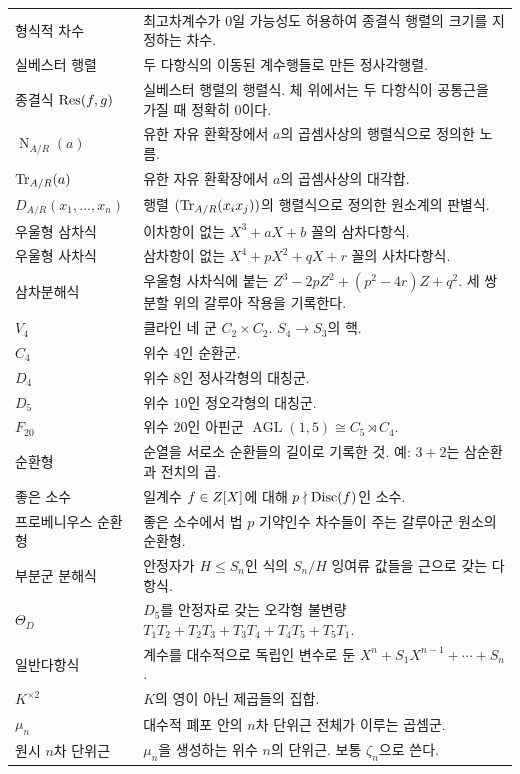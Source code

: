 \begin{longtable}{>{\raggedright\arraybackslash}p{}>{\raggedright\arraybackslash}p{}}
형식적 차수 & 최고차계수가 $0$일 가능성도 허용하여 종결식 행렬의 크기를 지정하는 차수. \\
실베스터 행렬 & 두 다항식의 이동된 계수행들로 만든 정사각행렬. \\
종결식 $\operatorname{Res}(f,g)$ & 실베스터 행렬의 행렬식. 체 위에서는 두 다항식이 공통근을 가질 때 정확히 $0$이다. \\
$\operatorname N_{A/R}(a)$ & 유한 자유 환확장에서 $a$의 곱셈사상의 행렬식으로 정의한 노름. \\
$\operatorname{Tr}_{A/R}(a)$ & 유한 자유 환확장에서 $a$의 곱셈사상의 대각합. \\
$D_{A/R}(x_1,\dots,x_n)$ & 행렬 $(\operatorname{Tr}_{A/R}(x_ix_j))$의 행렬식으로 정의한 원소계의 판별식. \\
우울형 삼차식 & 이차항이 없는 $X^3+aX+b$ 꼴의 삼차다항식. \\
우울형 사차식 & 삼차항이 없는 $X^4+pX^2+qX+r$ 꼴의 사차다항식. \\
삼차분해식 & 우울형 사차식에 붙는 $Z^3-2pZ^2+(p^2-4r)Z+q^2$. 세 쌍분할 위의 갈루아 작용을 기록한다. \\
$V_4$ & 클라인 네 군 $C_2\times C_2$. $S_4\to S_3$의 핵. \\
$C_4$ & 위수 $4$인 순환군. \\
$D_4$ & 위수 $8$인 정사각형의 대칭군. \\
$D_5$ & 위수 $10$인 정오각형의 대칭군. \\
$F_{20}$ & 위수 $20$인 아핀군 $\operatorname{AGL}(1,5)\cong C_5\rtimes C_4$. \\
순환형 & 순열을 서로소 순환들의 길이로 기록한 것. 예: $3+2$는 삼순환과 전치의 곱. \\
좋은 소수 & 일계수 $f\in Z[X]$에 대해 $p\nmid\operatorname{Disc}(f)$인 소수. \\
프로베니우스 순환형 & 좋은 소수에서 법 $p$ 기약인수 차수들이 주는 갈루아군 원소의 순환형. \\
부분군 분해식 & 안정자가 $H\le S_n$인 식의 $S_n/H$ 잉여류 값들을 근으로 갖는 다항식. \\
$\Theta_D$ & $D_5$를 안정자로 갖는 오각형 불변량 $T_1T_2+T_2T_3+T_3T_4+T_4T_5+T_5T_1$. \\
일반다항식 & 계수를 대수적으로 독립인 변수로 둔 $X^n+S_1X^{n-1}+\cdots+S_n$. \\
$K^{\times2}$ & $K$의 영이 아닌 제곱들의 집합. \\
$\mu_n$ & 대수적 폐포 안의 $n$차 단위근 전체가 이루는 곱셈군. \\
원시 $n$차 단위근 & $\mu_n$을 생성하는 위수 $n$의 단위근. 보통 $\zeta_n$으로 쓴다. \\

\end{longtable}
